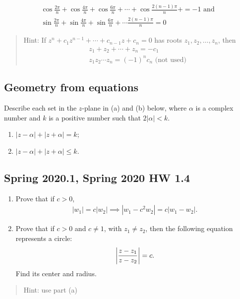 \begin{align*}
\cos \frac{2 \pi}{n}+\cos \frac{4 \pi}{n}+\cos \frac{6 \pi}{n}+\cdots+\cos \frac{2(n-1) \pi}{n}+=-1 \text { and } \\
\sin \frac{2 \pi}{n}+\sin \frac{4 \pi}{n}+\sin \frac{6 \pi}{n}+\cdots \frac{2(n-1) \pi}{n}=0
\end{align*}

\begin{quote}
Hint: If \(z^{n}+c_{1} z^{n-1}+\cdots+c_{n-1} z+c_{n}=0\) has roots
\(z_{1}, z_{2}, \ldots, z_{n}\), then
\begin{align*}
z_{1}+z_{2}+\cdots+z_{n}=-c_{1} \\
z_{1} z_{2} \cdots z_{n}=(-1)^{n} c_{n} \text { (not used) }
\end{align*}
\end{quote}

\hypertarget{geometry-from-equations}{%
\subsection{Geometry from equations}\label{geometry-from-equations}}

Describe each set in the \(z\)-plane in (a) and (b) below, where
\(\alpha\) is a complex number and \(k\) is a positive number such that
\(2|\alpha|<k\).

\begin{enumerate}
\def\labelenumi{(\alph{enumi})}
\item
  \(|z-\alpha|+|z+\alpha|=k\);
\item
  \(|z-\alpha|+|z+\alpha| \leq k\).
\end{enumerate}

\hypertarget{spring-2020.1-spring-2020-hw-1.4}{%
\subsection{Spring 2020.1, Spring 2020 HW
1.4}\label{spring-2020.1-spring-2020-hw-1.4}}

\begin{problem}[?]

\envlist

\begin{enumerate}
\def\labelenumi{\alph{enumi}.}
\item
  Prove that if \(c>0\),
  \begin{align*}
  {\left\lvert {w_1} \right\rvert} = c{\left\lvert {w_2} \right\rvert} \implies {\left\lvert {w_1 - c^2 w_2} \right\rvert} = c{\left\lvert {w_1 - w_2} \right\rvert}
  .\end{align*}
\item
  Prove that if \(c>0\) and \(c\neq 1\), with \(z_1\neq z_2\), then the
  following equation represents a circle:
  \begin{align*}
  {\left\lvert {z-z_1 \over z-z_2} \right\rvert} = c
  .\end{align*}
  Find its center and radius.
\end{enumerate}

\begin{quote}
Hint: use part (a)
\end{quote}

\end{problem}

